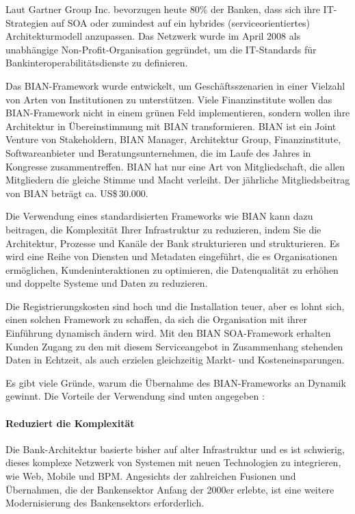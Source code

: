 \documentclass[
	doc,
	a4paper,
	helv
	]{apa6}
\begin{document}
Laut Gartner Group Inc. bevorzugen heute 80\% der Banken, dass sich ihre IT-Strategien auf SOA oder zumindest auf ein hybrides (serviceorientiertes) Architekturmodell anzupassen. Das Netzwerk wurde im April 2008 als unabhängige Non-Profit-Organisation gegründet, um die IT-Standards für Bankinteroperabilitätsdienste zu definieren.

Das BIAN-Framework wurde entwickelt, um Geschäftsszenarien in einer Vielzahl von Arten von Institutionen zu unterstützen. Viele Finanzinstitute wollen das BIAN-Framework nicht in einem grünen Feld implementieren, sondern wollen ihre Architektur in Übereinstimmung mit BIAN transformieren. BIAN ist ein Joint Venture von Stakeholdern,  BIAN Manager, Architektur Group, Finanzinstitute, Softwareanbieter und Beratungsunternehmen, die im Laufe des Jahres in Kongresse zusammentreffen. BIAN hat nur eine Art von Mitgliedschaft, die allen Mitgliedern die gleiche Stimme und Macht verleiht. Der jährliche Mitgliedsbeitrag von BIAN beträgt ca. US\$\,30.000.

Die Verwendung eines standardisierten Frameworks wie BIAN kann dazu beitragen, die Komplexität Ihrer Infrastruktur zu reduzieren, indem Sie die Architektur, Prozesse und Kanäle der Bank strukturieren und strukturieren. Es wird eine Reihe von Diensten und Metadaten eingeführt, die es Organisationen ermöglichen, Kundeninteraktionen zu optimieren, die Datenqualität zu erhöhen und doppelte Systeme und Daten zu reduzieren. \autocite{BIAN}

Die Registrierungskosten sind hoch und die Installation teuer, aber es lohnt sich, einen solchen Framework zu schaffen, da sich die Organisation mit ihrer Einführung dynamisch ändern wird. Mit den BIAN SOA-Framework erhalten Kunden Zugang zu den mit diesem Serviceangebot in Zusammenhang stehenden Daten in Echtzeit, als auch erzielen  gleichzeitig Markt- und Kosteneinsparungen.

Es gibt viele Gründe, warum die Übernahme des BIAN-Frameworks an Dynamik gewinnt. Die Vorteile der Verwendung sind unten angegeben \autocite{BIAN2}: 
\paragraph{Reduziert die Komplexität}
Die Bank-Architektur basierte bisher auf alter Infrastruktur und es ist schwierig, dieses komplexe Netzwerk von Systemen mit neuen Technologien zu integrieren, wie Web, Mobile und BPM. Angesichts der zahlreichen Fusionen und Übernahmen, die der Bankensektor Anfang der 2000er erlebte, ist eine weitere Modernisierung des Bankensektors erforderlich.
\end{document}
